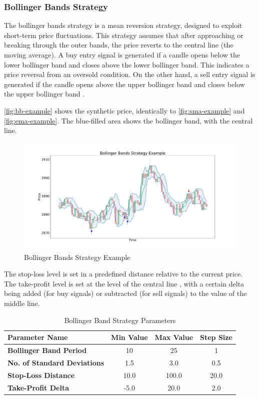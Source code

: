 \subsubsection{Bollinger Bands Strategy}

The bollinger bands strategy is a mean reversion strategy, designed to exploit short-term price fluctuations.
This strategy assumes that after approaching or breaking through the outer bands, the price reverts to the central line (the moving average).
A buy entry signal is generated if a candle opens below the lower bollinger band and closes above the lower bollinger band.
This indicates a price reversal from an oversold condition.
On the other hand, a sell entry signal is generated if the candle opens above the upper bollinger band and closes below the upper bollinger band \cite{bb-basics}.

\autoref{fig:bb-example} shows the synthetic price, identically to \autoref{fig:sma-example} and \autoref{fig:ema-example}.
The blue-filled area shows the bollinger band, with the central line.

\begin{figure}[H]
    \centering
    \includegraphics[width=\textwidth]{images/trading-strategies/bb-example}
    \caption{Bollinger Bands Strategy Example}
    \label{fig:bb-example}
\end{figure}

\noindent
The stop-loss level is set in a predefined distance relative to the current price.
The take-profit level is set at the level of the central line , with a certain delta being added (for buy signals) or subtracted (for sell signals) to the value of the middle line.

\begin{table}[H]
    \centering
    \begin{tabular}{L{4cm}ccc}
        \toprule
        Parameter Name & Min Value & Max Value & Step Size
        \\
        \midrule
        \textbf{Bollinger Band Period}      & 10   & 25    & 1    \\
        \textbf{No. of Standard Deviations} & 1.5  & 3.0   & 0.5  \\
        \textbf{Stop-Loss Distance}         & 10.0 & 100.0 & 20.0 \\
        \textbf{Take-Profit Delta}          & -5.0 & 20.0  & 2.0  \\
        \bottomrule
    \end{tabular}
    \caption{Bollinger Band Strategy Parameters}
    \label{tbl:bb-strategy-parameters}
\end{table}
